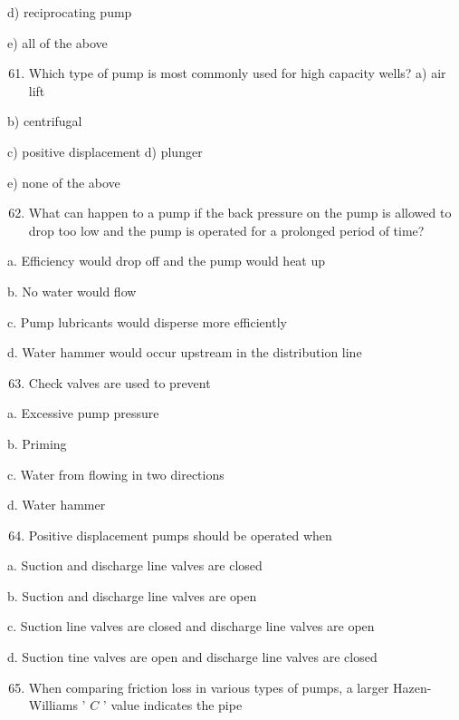 \documentclass[10pt]{article}
\begin{document}
\begin{enumerate}
\begin{enumerate}
d) reciprocating pump

e) all of the above

\begin{enumerate}
  \setcounter{enumi}{60}
  \item Which type of pump is most commonly used for high capacity wells? a) air lift
\end{enumerate}

b) centrifugal

c) positive displacement d) plunger

e) none of the above

\begin{enumerate}
  \setcounter{enumi}{61}
  \item What can happen to a pump if the back pressure on the pump is allowed to drop too low and the pump is operated for a prolonged period of time?
\end{enumerate}

a. Efficiency would drop off and the pump would heat up

b. No water would flow

c. Pump lubricants would disperse more efficiently

d. Water hammer would occur upstream in the distribution line

\begin{enumerate}
  \setcounter{enumi}{62}
  \item Check valves are used to prevent
\end{enumerate}

a. Excessive pump pressure

b. Priming

c. Water from flowing in two directions

d. Water hammer

\begin{enumerate}
  \setcounter{enumi}{63}
  \item Positive displacement pumps should be operated when
\end{enumerate}

a. Suction and discharge line valves are closed

b. Suction and discharge line valves are open

c. Suction line valves are closed and discharge line valves are open

d. Suction tine valves are open and discharge line valves are closed

\begin{enumerate}
  \setcounter{enumi}{64}
  \item When comparing friction loss in various types of pumps, a larger Hazen-Williams ' $C$ ' value indicates the pipe
\end{enumerate}


\end{enumerate}
\end{enumerate}
\end{document}
